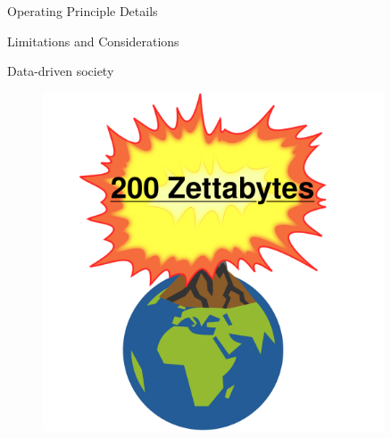 \documentclass{beamer}
\begin{document}
\begin{frame}{Operating Principle Details}
\end{frame}

\begin{frame}{Limitations and Considerations}
\end{frame}

\begin{frame}{Data-driven society}
	\begingroup
	\small
	\begin{figure}
		\centering
		\includegraphics[width=0.9\textwidth]{resources/images/data-problem.png}
	\end{figure}
	\endgroup
\end{frame}
\end{document}

